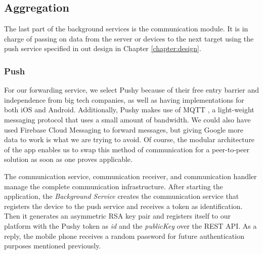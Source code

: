 \subsection{Aggregation}
The last part of the background services is the communication module. It is in charge of passing on data from the server or devices to the next target using the push service specified in out design in Chapter \ref{chapter:design}.

\subsubsection{Push}
For our forwarding service, we select Pushy \cite{pushy} because of their free entry barrier and independence from big tech companies, as well as having implementations for both iOS and Android. Additionally, Pushy makes use of MQTT \cite{mqtt}, a light-weight messaging protocol that uses a small amount of bandwidth. We could also have used Firebase Cloud Messaging to forward messages, but giving Google more data to work is what we are trying to avoid.   Of course, the modular architecture of the app enables us to swap this method of communication for a peer-to-peer solution as soon as one proves applicable.

The communication service, communication receiver, and communication handler manage the complete communication infrastructure. After starting the application, the \textit{Background Service} creates the communication service that registers the device to the push service and receives a token as identification. Then it generates an asymmetric RSA key pair and registers itself to our platform with the Pushy token as \textit{id} and the \textit{publicKey} over the REST API. As a reply, the mobile phone receives a random password for future authentication purposes mentioned previously.

